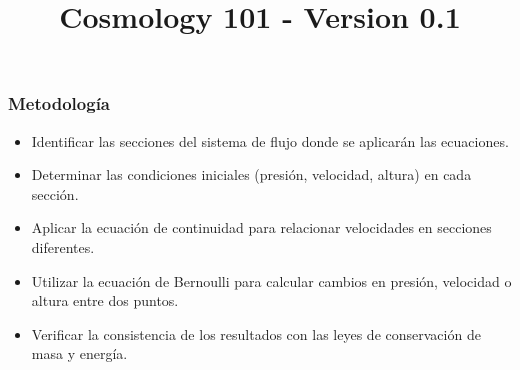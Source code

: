 \documentclass{article}\usepackage{graphicx} \usepackage{amsmath} \usepackage{colortbl}\title{Cosmology 101 - Version 0.1}
\begin{document}
\subsubsection{Metodolog{\'i}a}
\begin{itemize}
\item Identificar las secciones del sistema de flujo donde se aplicarán las ecuaciones.
\item Determinar las condiciones iniciales (presión, velocidad, altura) en cada sección.
\item Aplicar la ecuación de continuidad para relacionar velocidades en secciones diferentes.
\item Utilizar la ecuación de Bernoulli para calcular cambios en presión, velocidad o altura entre dos puntos.
\item Verificar la consistencia de los resultados con las leyes de conservación de masa y energía.
\end{itemize}
\end{document}
